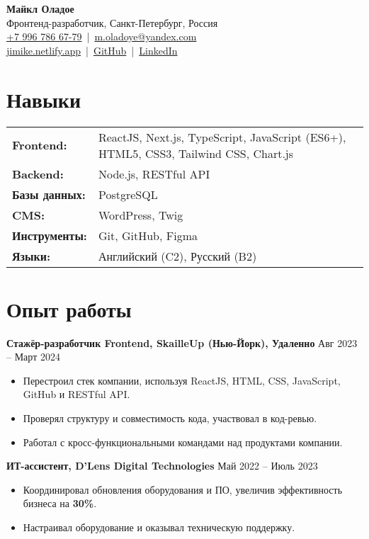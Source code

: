 \documentclass[a4paper,10pt]{article}
\begin{document}
\begin{center}
    {\LARGE \textbf{Майкл Оладое}} \\[4pt]
    Фронтенд-разработчик, Санкт-Петербург, Россия \\[4pt]
    \href{tel:+79967866779}{+7 996 786 67-79} \,|\, \href{mailto:m.oladoye@yandex.com}{m.oladoye@yandex.com} \\
    \href{https://jimike.netlify.app}{jimike.netlify.app} \,|\, 
    \href{https://github.com/Jimike110}{GitHub} \,|\, 
    \href{https://www.linkedin.com/in/jimike}{LinkedIn}
\end{center}

\section*{Навыки}
\begin{tabular}{ l l }
\textbf{Frontend:} & ReactJS, Next.js, TypeScript, JavaScript (ES6+), HTML5, CSS3, Tailwind CSS, Chart.js \\
\textbf{Backend:} & Node.js, RESTful API \\
\textbf{Базы данных:} & PostgreSQL \\
\textbf{CMS:} & WordPress, Twig \\
\textbf{Инструменты:} & Git, GitHub, Figma \\
\textbf{Языки:} & Английский (C2), Русский (B2) \\
\end{tabular}

\section*{Опыт работы}
\textbf{Стажёр-разработчик Frontend, SkailleUp (Нью-Йорк), Удаленно} \hfill Авг 2023 – Март 2024 \\
\begin{itemize}[left=0.5cm]
    \item Перестроил стек компании, используя ReactJS, HTML, CSS, JavaScript, GitHub и RESTful API.
    \item Проверял структуру и совместимость кода, участвовал в код-ревью.
    \item Работал с кросс-функциональными командами над продуктами компании.
\end{itemize}

\noindent \textbf{ИТ-ассистент, D’Lens Digital Technologies} \hfill Май 2022 – Июль 2023 \\
\begin{itemize}[left=0.5cm]
    \item Координировал обновления оборудования и ПО, увеличив эффективность бизнеса на \textbf{30\%}.
    \item Настраивал оборудование и оказывал техническую поддержку.
\end{itemize}
\end{document}
